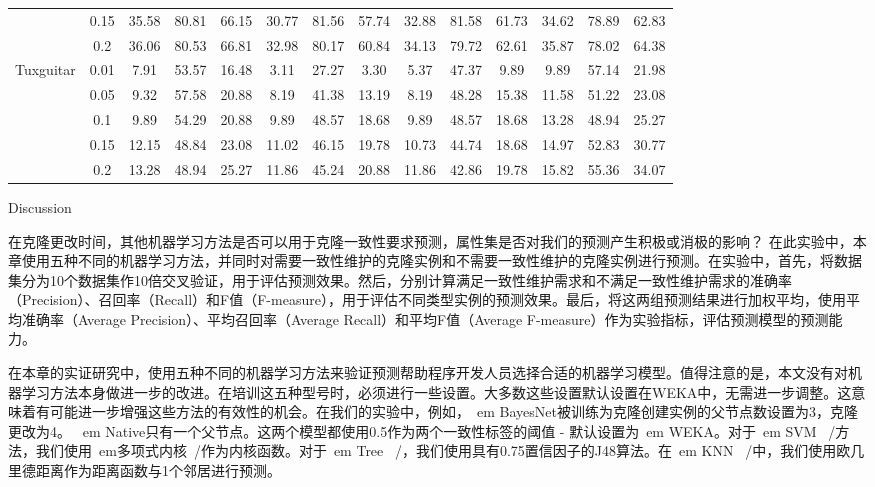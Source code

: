 \begin{sidewaystable}
\begin{tabular}{cccccccccccccc}
&0.15&	35.58&	80.81&	66.15&	30.77&	81.56&	57.74&	32.88&	81.58&	61.73&	34.62&	78.89&	62.83\\
&0.2&	36.06&	80.53&	66.81&	32.98&	80.17&	60.84&	34.13&	79.72&	62.61&	35.87&	78.02&	64.38\\
\hline
\multirow{5}{*}{Tuxguitar}
&0.01&	7.91&	53.57&	16.48&	3.11&	27.27&	3.30&	5.37&	47.37&	9.89&	9.89&	57.14&	21.98\\
&0.05&	9.32&	57.58&	20.88&	8.19&	41.38&	13.19&	8.19&	48.28&	15.38&	11.58&	51.22&	23.08\\
&0.1&	9.89&	54.29&	20.88&	9.89&	48.57&	18.68&	9.89&	48.57&	18.68&	13.28&	48.94&	25.27\\
&0.15&	12.15&	48.84&	23.08&	11.02&	46.15&	19.78&	10.73&	44.74&	18.68&	14.97&	52.83&	30.77\\
&0.2&	13.28&	48.94&	25.27&	11.86&	45.24&	20.88&	11.86&	42.86&	19.78&	15.82&	55.36&	34.07\\
\bottomrule[1.5pt]
\end{tabular}
\end{sidewaystable} 

{Discussion}

在克隆更改时间，其他机器学习方法是否可以用于克隆一致性要求预测，属性集是否对我们的预测产生积极或消极的影响？
在此实验中，本章使用五种不同的机器学习方法，并同时对需要一致性维护的克隆实例和不需要一致性维护的克隆实例进行预测。在实验中，首先，将数据集分为10个数据集作10倍交叉验证，用于评估预测效果。然后，分别计算满足一致性维护需求和不满足一致性维护需求的准确率（Precision）、召回率（Recall）和F值（F-measure），用于评估不同类型实例的预测效果。最后，将这两组预测结果进行加权平均，使用平均准确率（Average Precision）、平均召回率（Average Recall）和平均F值（Average F-measure）作为实验指标，评估预测模型的预测能力。

在本章的实证研究中，使用五种不同的机器学习方法来验证预测帮助程序开发人员选择合适的机器学习模型。值得注意的是，本文没有对机器学习方法本身做进一步的改进。在培训这五种型号时，必须进行一些设置。大多数这些设置默认设置在WEKA中，无需进一步调整。这意味着有可能进一步增强这些方法的有效性的机会。在我们的实验中，例如，{\ em BayesNet}被训练为克隆创建实例的父节点数设置为3，克隆更改为4。 {\ em Native}只有一个父节点。这两个模型都使用0.5作为两个一致性标签的阈值 - 默认设置为{\ em WEKA}。对于{\ em SVM \ /}方法，我们使用{\ em多项式内核\ /}作为内核函数。对于{\ em Tree \ /}，我们使用具有0.75置信因子的J48算法。在{\ em KNN \ /}中，我们使用欧几里德距离作为距离函数与1个邻居进行预测。

